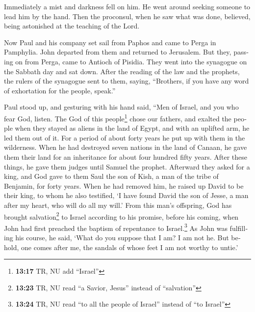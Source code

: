 \begin{paracol}{2}
\begin{otherlanguage}{english}
Immediately a mist and darkness fell on him. He went around seeking
someone to lead him by the hand.  Then the proconsul,
when he saw what was done, believed, being astonished at the teaching of
the Lord.

 Now Paul and his company set sail from Paphos and came
to Perga in Pamphylia. John departed from them and returned to
Jerusalem.  But they, passing on from Perga, came to
Antioch of Pisidia. They went into the synagogue on the Sabbath day and
sat down.  After the reading of the law and the prophets,
the rulers of the synagogue sent to them, saying, ``Brothers, if you
have any word of exhortation for the people, speak.''

 Paul stood up, and gesturing with his hand said, ``Men
of Israel, and you who fear God, listen.  The God of this
people\footnote{\textbf{13:17} TR, NU add ``Israel''} chose our fathers,
and exalted the people when they stayed as aliens in the land of Egypt,
and with an uplifted arm, he led them out of it.  For a
period of about forty years he put up with them in the wilderness.
 When he had destroyed seven nations in the land of
Canaan, he gave them their land for an inheritance for about four
hundred fifty years.  After these things, he gave them
judges until Samuel the prophet.  Afterward they asked
for a king, and God gave to them Saul the son of Kish, a man of the
tribe of Benjamin, for forty years.  When he had removed
him, he raised up David to be their king, to whom he also testified, `I
have found David the son of Jesse, a man after my heart, who will do all
my will.'  From this man's offspring, God has brought
salvation\footnote{\textbf{13:23} TR, NU read ``a Savior, Jesus''
  instead of ``salvation''} to Israel according to his promise,
 before his coming, when John had first preached the
baptism of repentance to Israel.\footnote{\textbf{13:24} TR, NU read
  ``to all the people of Israel'' instead of ``to Israel''}
 As John was fulfilling his course, he said, `What do you
suppose that I am? I am not he. But behold, one comes after me, the
sandals of whose feet I am not worthy to untie.'


\end{otherlanguage}
\end{paracol}
